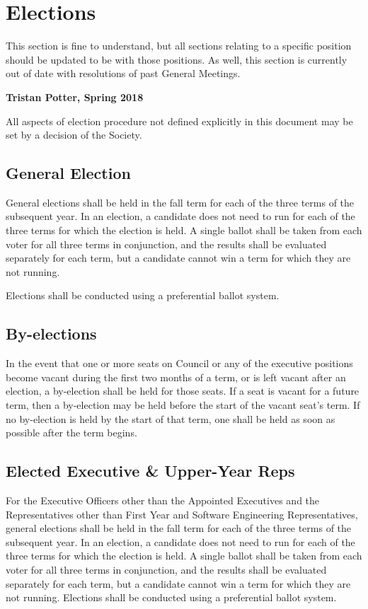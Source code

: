 \section{Elections}
\begin{annotation}
    This section is fine to understand, but all sections relating to a specific
    position should be updated to be with those positions. As well, this 
    section is currently out of date with resolutions of past General Meetings.
    
    \textbf{Tristan Potter, Spring 2018}
\end{annotation}

All aspects of election procedure not defined explicitly in this document may be
set by a decision of the Society.

\subsection{General Election}
General elections shall be held in the fall term for each of the three terms 
of the subsequent year. In an election, a candidate does not need to run for 
each of the three terms for which the election is held. A single ballot shall 
be taken from each voter for all three terms in conjunction, and the results 
shall be evaluated separately for each term, but a candidate cannot win a term 
for which they are not running.

Elections shall be conducted using a preferential ballot system.

\subsection{By-elections}
In the event that one or more seats on Council or any of the executive
positions become vacant during the first two months of a term, or is left
vacant after an election, a by-election shall be held for those seats. If a
seat is vacant for a future term, then a by-election may be held before the
start of the vacant seat’s term. If no by-election is held by the start of that
term, one shall be held as soon as possible after the term begins.

\subsection{Elected Executive \& Upper-Year Reps}
For the Executive Officers other than the Appointed Executives and the
Representatives other than First Year and Software Engineering Representatives,
general elections shall be held in the fall term for each of the three terms of
the subsequent year. In an election, a candidate does not need to run for each
of the three terms for which the election is held. A single ballot shall be
taken from each voter for all three terms in conjunction, and the results shall
be evaluated separately for each term, but a candidate cannot win a term for
which they are not running. Elections shall be conducted using a preferential
ballot system.

